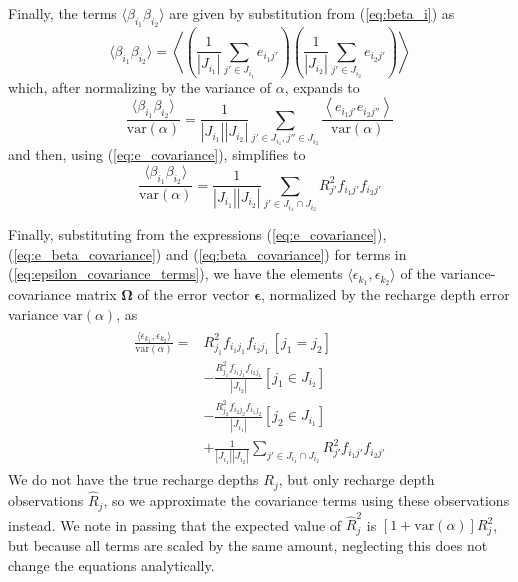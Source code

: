 \documentclass[11pt,a4paper]{article}
\begin{document}
Finally, the terms $\langle\beta_{i_1}\beta_{i_2}\rangle$ are given by
substitution from (\ref{eq:beta_i}) as
\begin{equation}
  \langle\beta_{i_1}\beta_{i_2}\rangle =
  \left\langle
  \left(\frac{1}{|J_{i_1}|}\sum_{j' \in J_{i_1}} e_{i_1 j'}\right)
  \left(\frac{1}{|J_{i_2}|}\sum_{j' \in J_{i_2}} e_{i_2 j'}\right)
  \right\rangle
\end{equation}
which, after normalizing by the variance of $\alpha$, expands to
\begin{equation}
  \frac{\langle\beta_{i_1}\beta_{i_2}\rangle}{\text{var}(\alpha)} =
  \frac{1}{|J_{i_1}| |J_{i_2}|}
    \sum_{j' \in J_{i_1}, j'' \in J_{i_2}} \frac{\left\langle e_{i_1 j'} e_{i_2 j''} \right\rangle}{\text{var}(\alpha)}
\end{equation}
and then, using (\ref{eq:e_covariance}), simplifies to
\begin{equation}
  \label{eq:beta_covariance}
  \frac{\langle\beta_{i_1}\beta_{i_2}\rangle}{\text{var}(\alpha)} =
  \frac{1}{|J_{i_1}| |J_{i_2}|} \sum_{j' \in J_{i_1}\cap J_{i_2}} R_{j'}^2 f_{i_1 j'} f_{i_2 j'}
\end{equation}

Finally, substituting from the expressions
(\ref{eq:e_covariance}), (\ref{eq:e_beta_covariance}) and
(\ref{eq:beta_covariance}) for terms in
(\ref{eq:epsilon_covariance_terms}), we have the elements
$\langle \epsilon_{k_1}, \epsilon_{k_2} \rangle$ of the
variance-covariance matrix $\bm{\Omega}$ of the error vector
$\mathbf{\epsilon}$, normalized by the recharge depth error variance
$\text{var}(\alpha)$, as
\begin{align}
\begin{split}
\label{eq:epsilon_normalized_covariance}
  \frac{\langle \epsilon_{k_1}, \epsilon_{k_2} \rangle}{\text{var}(\alpha)} =
  &R_{j_1}^2 f_{i_1 j_1} f_{i_2 j_1}\, [j_1 = j_2] \\
  &- \frac{R_{j_1}^2 f_{i_1 j_1} f_{i_2 j_1}}{|J_{i_2}|} [j_1 \in J_{i_2}]\\
  &- \frac{R_{j_2}^2 f_{i_2 j_2} f_{i_1 j_2}}{|J_{i_1}|} [j_2 \in J_{i_1}]\\
  &+ \frac{1}{|J_{i_1}| |J_{i_2}|} \sum_{j' \in J_{i_1}\cap J_{i_2}} R_{j'}^2 f_{i_1 j'} f_{i_2 j'}
\end{split}
\end{align}
We do not have the true recharge depths $R_j$, but only recharge depth
observations $\widehat{R}_j$, so we approximate the covariance terms
using these observations instead.  We note in passing that the
expected value of $\widehat{R}_j^2$ is
$[1 + \text{var}(\alpha)]R_j^2$, but because all terms are scaled by
the same amount, neglecting this does not change the equations
analytically.
\end{document}
